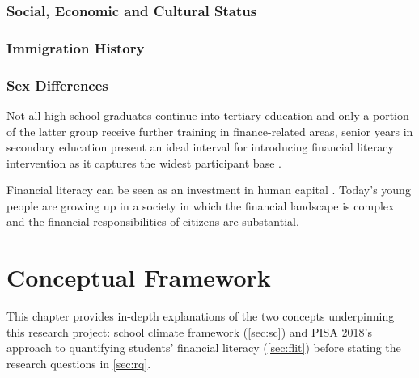 \documentclass[a4paper,11pt,UKenglish,twoside,openright]{report}\usepackage[]{graphicx}\usepackage[]{color}
\begin{document}
\subsection{Social, Economic and Cultural Status}

\subsection{Immigration History}

\subsection{Sex Differences}


Not all high school graduates continue into tertiary education and only a portion of the latter group receive further training in finance-related areas, senior years in secondary education present an ideal interval for introducing financial literacy intervention as it captures the widest participant base \parencite{walstad:2016}.





Financial literacy can be seen as an investment in human capital \parencite{lusardi:2014}. Today's young people are growing up in a society in which the financial landscape is complex and the financial responsibilities of citizens are substantial.







\chapter{Conceptual Framework}
\label{chp:2}





This chapter provides in-depth explanations of the two concepts underpinning this research project:  school climate framework (\cref{sec:sc}) and PISA 2018's approach to quantifying students' financial literacy (\cref{sec:flit}) before stating the research questions in \cref{sec:rq}.
\end{document}
